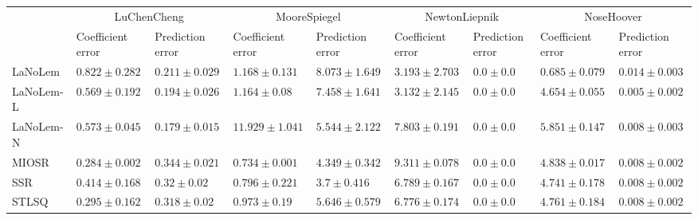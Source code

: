 \begin{table*}
{\begin{tabular}{lllllllll}
 & \multicolumn{2}{c}{LuChenCheng} & \multicolumn{2}{c}{MooreSpiegel} & \multicolumn{2}{c}{NewtonLiepnik} & \multicolumn{2}{c}{NoseHoover} \\
 & Coefficient error & Prediction error & Coefficient error & Prediction error & Coefficient error & Prediction error & Coefficient error & Prediction error \\
\midrule
LaNoLem & $0.822\pm 0.282$ & $0.211\pm 0.029$ & $1.168\pm 0.131$ & $8.073\pm 1.649$ & $3.193\pm 2.703$ & $0.0\pm 0.0$ & $\mathbf{0.685}\pm 0.079$ & $0.014\pm 0.003$ \\
LaNoLem-L & $0.569\pm 0.192$ & $0.194\pm 0.026$ & $1.164\pm 0.08$ & $7.458\pm 1.641$ & $\mathbf{3.132}\pm 2.145$ & $0.0\pm 0.0$ & $4.654\pm 0.055$ & $\mathbf{0.005}\pm 0.002$ \\
LaNoLem-N & $0.573\pm 0.045$ & $\mathbf{0.179}\pm 0.015$ & $11.929\pm 1.041$ & $5.544\pm 2.122$ & $7.803\pm 0.191$ & $\mathbf{0.0}\pm 0.0$ & $5.851\pm 0.147$ & $0.008\pm 0.003$ \\
MIOSR & $\mathbf{0.284}\pm 0.002$ & $0.344\pm 0.021$ & $\mathbf{0.734}\pm 0.001$ & $4.349\pm 0.342$ & $9.311\pm 0.078$ & $0.0\pm 0.0$ & $4.838\pm 0.017$ & $0.008\pm 0.002$ \\
SSR & $0.414\pm 0.168$ & $0.32\pm 0.02$ & $0.796\pm 0.221$ & $\mathbf{3.7}\pm 0.416$ & $6.789\pm 0.167$ & $0.0\pm 0.0$ & $4.741\pm 0.178$ & $0.008\pm 0.002$ \\
STLSQ & $0.295\pm 0.162$ & $0.318\pm 0.02$ & $0.973\pm 0.19$ & $5.646\pm 0.579$ & $6.776\pm 0.174$ & $0.0\pm 0.0$ & $4.761\pm 0.184$ & $0.008\pm 0.002$ \\

\bottomrule
\end{tabular}
}
\end{table*}
